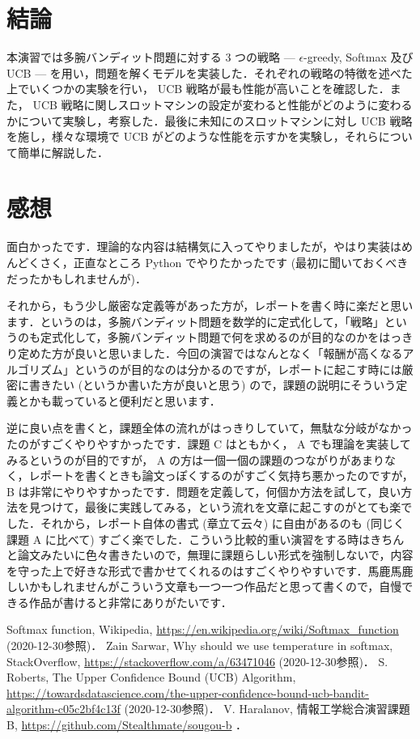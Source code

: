 \documentclass{jsarticle}
\begin{document}
\section{結論}\label{sec:end}

本演習では多腕バンディット問題に対する 3 つの戦略 --- $\epsilon$-greedy, Softmax 及び UCB --- を用い，問題を解くモデルを実装した．それぞれの戦略の特徴を述べた上でいくつかの実験を行い， UCB 戦略が最も性能が高いことを確認した．また， UCB 戦略に関しスロットマシンの設定が変わると性能がどのように変わるかについて実験し，考察した．最後に未知にのスロットマシンに対し UCB 戦略を施し，様々な環境で UCB がどのような性能を示すかを実験し，それらについて簡単に解説した．

\section*{感想}

面白かったです．理論的な内容は結構気に入ってやりましたが，やはり実装はめんどくさく，正直なところ Python でやりたかったです (最初に聞いておくべきだったかもしれませんが)．

それから，もう少し厳密な定義等があった方が，レポートを書く時に楽だと思います．というのは，多腕バンディット問題を数学的に定式化して，「戦略」というのも定式化して，多腕バンディット問題で何を求めるのが目的なのかをはっきり定めた方が良いと思いました．今回の演習ではなんとなく「報酬が高くなるアルゴリズム」というのが目的なのは分かるのですが，レポートに起こす時には厳密に書きたい (というか書いた方が良いと思う) ので，課題の説明にそういう定義とかも載っていると便利だと思います．

逆に良い点を書くと，課題全体の流れがはっきりしていて，無駄な分岐がなかったのがすごくやりやすかったです．課題 C はともかく， A でも理論を実装してみるというのが目的ですが， A の方は一個一個の課題のつながりがあまりなく，レポートを書くときも論文っぽくするのがすごく気持ち悪かったのですが， B は非常にやりやすかったです．問題を定義して，何個か方法を試して，良い方法を見つけて，最後に実践してみる，という流れを文章に起こすのがとても楽でした．それから，レポート自体の書式 (章立て云々) に自由があるのも (同じく課題 A に比べて) すごく楽でした．こういう比較的重い演習をする時はきちんと論文みたいに色々書きたいので，無理に課題らしい形式を強制しないで，内容を守った上で好きな形式で書かせてくれるのはすごくやりやすいです．馬鹿馬鹿しいかもしれませんがこういう文章も一つ一つ作品だと思って書くので，自慢できる作品が書けると非常にありがたいです．

\begin{thebibliography}{9}
 Softmax function, Wikipedia, \url{https://en.wikipedia.org/wiki/Softmax_function} (2020-12-30参照)．
 Zain Sarwar, Why should we use temperature in softmax, StackOverflow, \url{https://stackoverflow.com/a/63471046} (2020-12-30参照)．
 S. Roberts, The Upper Confidence Bound (UCB) Algorithm, \\\url{https://towardsdatascience.com/the-upper-confidence-bound-ucb-bandit-algorithm-c05c2bf4c13f} (2020-12-30参照)．
 V. Haralanov, 情報工学総合演習課題 B, \url{https://github.com/Stealthmate/sougou-b} ．
\end{thebibliography}
\end{document}
